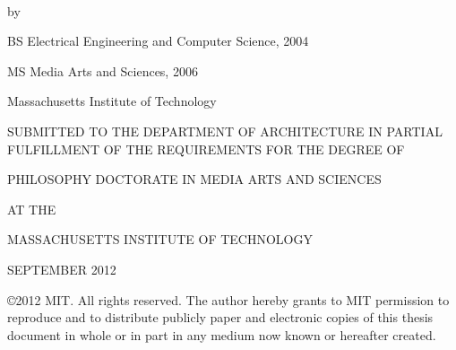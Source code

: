 \thispagestyle{empty}

~

\vspace{10mm}

\addtolength{\topmargin}{-2.5cm}
\enlargethispage*{5cm}

\begin{addmargin}[1cm]{-2cm}
\begin{center}
    \begingroup
        \color{Maroon}\spacedallcaps{\myTitle}
    \endgroup

    by

    \spacedlowsmallcaps{\myName}

    \vspace{2mm}
    
{\small
    BS Electrical Engineering and Computer Science, 2004
    
    MS Media Arts and Sciences, 2006

    Massachusetts Institute of Technology
}
    
    \vspace{2mm}

{\small
SUBMITTED TO THE DEPARTMENT OF ARCHITECTURE IN PARTIAL
FULFILLMENT OF THE REQUIREMENTS FOR THE DEGREE OF
}

    \vspace{2mm}

{\small
PHILOSOPHY DOCTORATE IN MEDIA ARTS AND SCIENCES

AT THE

MASSACHUSETTS INSTITUTE OF TECHNOLOGY
}

    \vspace{2mm}

{\small
SEPTEMBER 2012
}

    \vspace{2mm}

{\small
\copyright 2012 MIT.  All rights reserved.
The author hereby grants to MIT permission to reproduce
and to distribute publicly paper and electronic
copies of this thesis document in whole or in part
in any medium now known or hereafter created.
}

\end{center}        



\end{addmargin}
